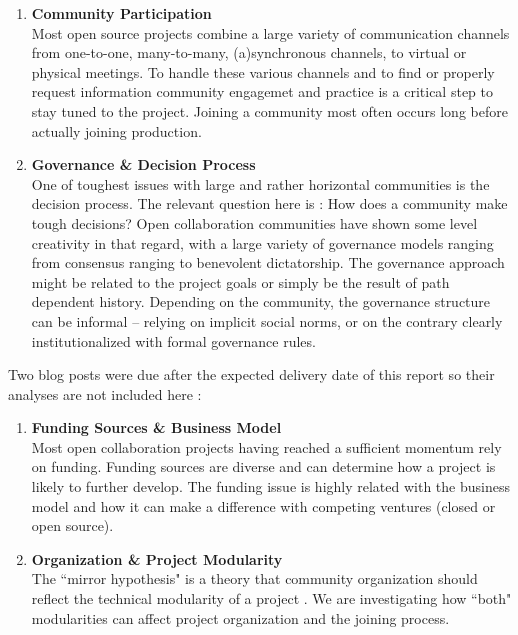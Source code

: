 \begin{enumerate}
  \item {\bf Community Participation} \\
Most open source projects combine a large variety of communication channels from one-to-one, many-to-many, (a)synchronous channels, to virtual or physical meetings. To handle these various channels and to find or properly request information community engagemet and practice is a critical step  to stay tuned to the project. Joining a community most often occurs long before actually joining production. \\

  \item {\bf Governance \& Decision Process}\\
  One of toughest issues with large and rather horizontal communities is the decision process. The relevant question here is : How does a community make tough decisions? Open collaboration communities have shown some level creativity in that regard, with a large variety of governance models ranging from consensus ranging to benevolent dictatorship. The governance approach might be related to the project goals or simply be the result of path dependent history. Depending on the community, the governance structure can be informal -- relying on implicit social norms, or on the contrary clearly institutionalized with formal governance rules.
\end{enumerate}


\noindent Two blog posts were due after the expected delivery date of this report so their analyses are not included here :

\begin{enumerate}[resume]
\item {\bf Funding Sources \& Business Model} \\
Most open collaboration projects having reached a sufficient momentum rely on funding. Funding sources are diverse and can determine how a project is likely to further develop. The funding issue is highly related with the business model and how it can make a difference with competing ventures (closed or open source).\\

\item{\bf Organization \& Project Modularity}\\
The ``mirror hypothesis" is a theory that community organization should reflect the technical modularity of a project \cite{maccormack2012}. We are investigating how ``both" modularities can affect project organization and the joining process.

\end{enumerate}


